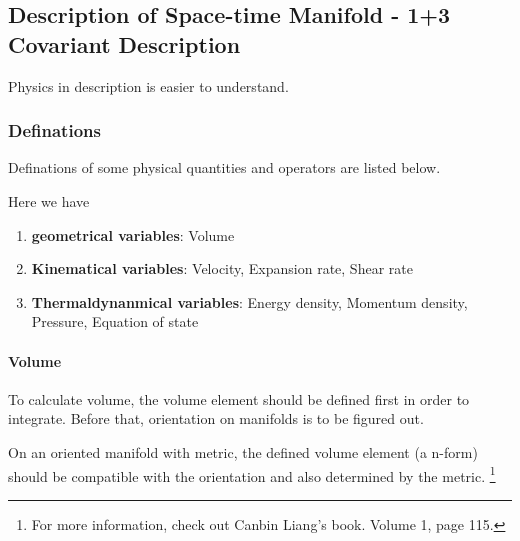 \documentclass[letterpaper,10pt,english]{sphinxmanual}
\begin{document}
{\subsection{Description of Space-time Manifold - 1+3 Covariant Description}
\label{GeneralRelativity:description-of-space-time-manifold-1-3-covariant-description}
Physics in description is easier to understand.


\subsubsection{Definations}
\label{GeneralRelativity:definations}
Definations of some physical quantities and operators are listed below.

Here we have
\begin{enumerate}
\item {} 
\textbf{geometrical variables}: Volume

\item {} 
\textbf{Kinematical variables}: Velocity, Expansion rate, Shear rate

\item {} 
\textbf{Thermaldynanmical variables}: Energy density, Momentum density, Pressure, Equation of state

\end{enumerate}


\paragraph{Volume}
\label{GeneralRelativity:volume}
To calculate volume, the volume element should be defined first in order to integrate. Before that, orientation on manifolds is to be figured out.

On an oriented manifold with metric, the defined volume element (a n-form) should be compatible with the orientation and also determined by the metric. \footnote{
For more information, check out Canbin Liang's book. Volume 1, page 115.
}

}
\end{document}
